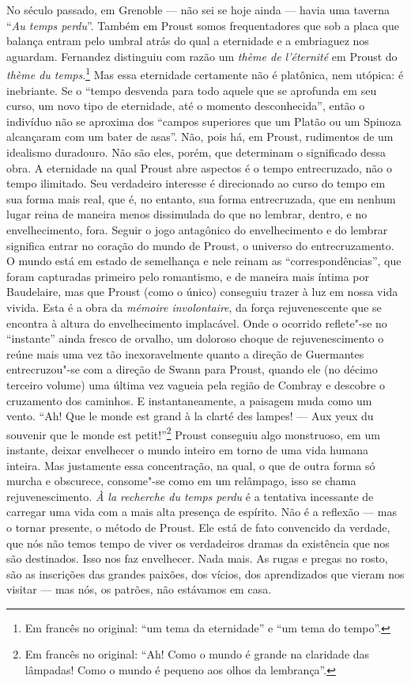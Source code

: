 No século passado, em Grenoble --- não sei se hoje ainda --- havia uma
taverna ``\emph{Au temps perdu}''. Também em Proust somos
frequentadores que sob a placa que balança entram pelo umbral atrás
do qual a eternidade e a embriaguez nos aguardam. Fernandez distinguiu
com razão um \emph{thème de l'éternité} em Proust do \emph{thème du
temps}.\footnote{Em francês no original: ``um tema da eternidade'' e ``um tema do tempo''. \versal{[N. T.]}}
Mas essa eternidade certamente não é platônica, nem utópica: é
inebriante. Se o ``tempo desvenda para todo aquele que se aprofunda em
seu curso, um novo tipo de eternidade, até o momento desconhecida'',
então o indivíduo não se aproxima dos ``campos superiores que um Platão
ou um Spinoza alcançaram com um bater de asas''. Não, pois há, em Proust,
rudimentos de um idealismo duradouro. Não são eles, porém, que
determinam o significado dessa obra. A eternidade na qual Proust abre
aspectos é o tempo entrecruzado, não o tempo ilimitado. Seu verdadeiro
interesse é direcionado ao curso do tempo em sua forma mais real, que é,
no entanto, sua forma entrecruzada, que em nenhum lugar reina de maneira
menos dissimulada do que no lembrar, dentro, e no envelhecimento, fora.
Seguir o jogo antagônico do envelhecimento e do lembrar significa entrar
no coração do mundo de Proust, o universo do entrecruzamento. O mundo
está em estado de semelhança e nele reinam as ``correspondências'', que
foram capturadas primeiro pelo romantismo, e de maneira mais íntima por
Baudelaire, mas que Proust (como o único) conseguiu trazer à luz em
nossa vida vivida. Esta é a obra da \emph{mémoire involontaire}, da
força rejuvenescente que se encontra à altura do envelhecimento
implacável. Onde o ocorrido reflete"-se no ``instante'' ainda fresco de
orvalho, um doloroso choque de rejuvenescimento o reúne mais uma vez tão
inexoravelmente quanto a direção de Guermantes entrecruzou"-se com a
direção de Swann para Proust, quando ele (no décimo terceiro volume) uma
última vez vagueia pela região de Combray e descobre o cruzamento dos
caminhos. E instantaneamente, a paisagem muda como um vento. ``Ah! Que
le monde est grand à la clarté des lampes! --- Aux yeux du
souvenir que le monde est petit!''\footnote{Em francês no original: ``Ah! Como o mundo é
  grande na claridade das lâmpadas! Como o mundo é pequeno aos olhos da
  lembrança''. \versal{[N. T.]}} Proust conseguiu algo monstruoso, em um instante, deixar
envelhecer o mundo inteiro em torno de uma vida humana inteira. Mas
justamente essa concentração, na qual, o que de outra forma só murcha e
obscurece, consome"-se como em um relâmpago, isso se chama
rejuvenescimento. \emph{À la recherche du temps perdu} é a tentativa
incessante de carregar uma vida com a mais alta presença de espírito.
Não é a reflexão --- mas o tornar presente, o método de Proust. Ele está
de fato convencido da verdade, que nós não temos tempo de viver os
verdadeiros dramas da existência que nos são destinados. Isso nos faz
envelhecer. Nada mais. As rugas e pregas no rosto, são as inscrições das
grandes paixões, dos vícios, dos aprendizados que vieram nos visitar ---
mas nós, os patrões, não estávamos em casa.

